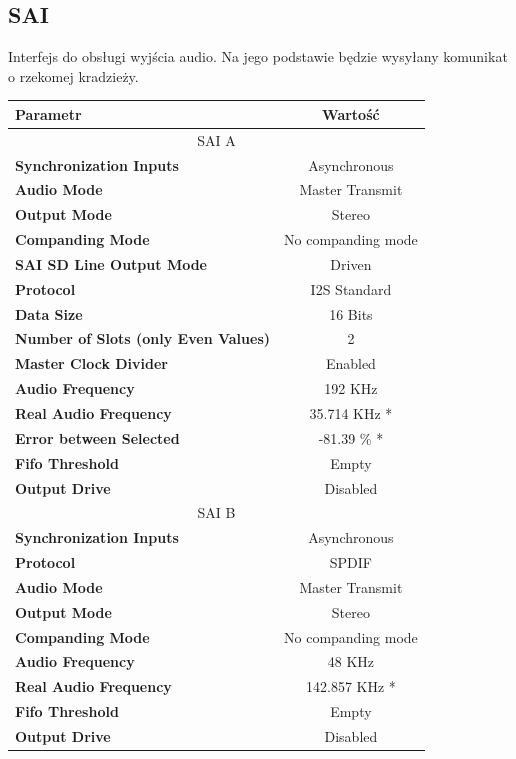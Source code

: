 \documentclass[10pt, a4paper]{article}
\begin{document}
\subsection{SAI}
Interfejs do obsługi wyjścia audio. Na jego podstawie będzie wysyłany komunikat o rzekomej kradzieży.
\begin{table}[H]
\centering
\begin{tabular}{|l|c|}
\hline
\textbf{Parametr} & Wartość \\
\hline
\hline
\multicolumn{2}{|c|}{SAI A} \\ \hline
\textbf{Synchronization Inputs} & Asynchronous \\ \hline
\textbf{Audio Mode} & Master Transmit \\ \hline
\textbf{Output Mode} & Stereo \\ \hline
\textbf{Companding Mode} & No companding mode \\ \hline
\textbf{SAI SD Line Output Mode} & Driven \\ \hline
\textbf{Protocol} & I2S Standard \\ \hline
\textbf{Data Size} & 16 Bits \\ \hline
\textbf{Number of Slots (only Even Values)} & 2 \\ \hline
\textbf{Master Clock Divider} & Enabled \\ \hline
\textbf{Audio Frequency} & 192 KHz \\ \hline
\textbf{Real Audio Frequency} & 35.714 KHz * \\ \hline
\textbf{Error between Selected} & -81.39 \% * \\ \hline
\textbf{Fifo Threshold} & Empty \\ \hline
\textbf{Output Drive} & Disabled \\ \hline
\multicolumn{2}{|c|}{SAI B} \\ \hline
\textbf{Synchronization Inputs} & Asynchronous \\ \hline
\textbf{Protocol} & SPDIF \\ \hline
\textbf{Audio Mode} & Master Transmit \\ \hline
\textbf{Output Mode} & Stereo \\ \hline
\textbf{Companding Mode} & No companding mode \\ \hline
\textbf{Audio Frequency} & 48 KHz \\ \hline
\textbf{Real Audio Frequency} & 142.857 KHz * \\ \hline
\textbf{Fifo Threshold} & Empty \\ \hline
\textbf{Output Drive} & Disabled \\ \hline
\end{tabular}
\end{table}
\end{document}
